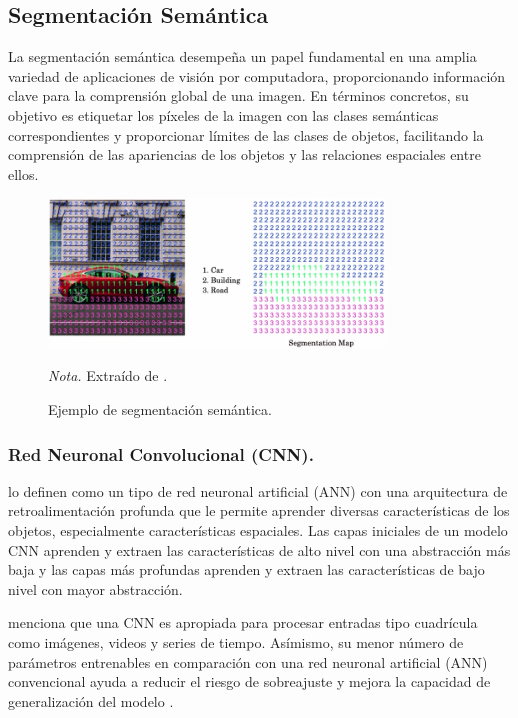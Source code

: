 \subsection{Segmentación Semántica}
La segmentación semántica desempeña un papel fundamental en una amplia variedad de aplicaciones de visión por computadora, proporcionando información clave para la comprensión global de una imagen. 
En términos concretos, su objetivo es etiquetar los píxeles de la imagen con las clases semánticas correspondientes y proporcionar límites de las clases de objetos, facilitando la comprensión de las apariencias de los objetos y las relaciones espaciales entre ellos.
\citep{csurka2023semantic}

\begin{figure}[H]
    \centering
    \caption{Ejemplo de segmentación semántica.}
    \includegraphics[width=0.8\textwidth]{img/4_marco_teorico/segmentation.png}
    \label{fig:semantic_segmentation}
    \begin{flushleft}
        \textit{Nota.} Extraído de \citet{ng_semantic_2023}. 
        \vspace{-\baselineskip}       
    \end{flushleft}  
\end{figure}

\subsubsection{Red Neuronal Convolucional (CNN).}
\citet{balas_recent_2020} lo definen como un tipo de red neuronal artificial (ANN) con una arquitectura de retroalimentación profunda que le permite aprender diversas características de los objetos, 
especialmente características espaciales. Las capas iniciales de un modelo CNN aprenden y extraen las características de alto nivel con una abstracción más baja y las capas más 
profundas aprenden y extraen las características de bajo nivel con mayor abstracción.

\citet{katsaros_backpropagation_2021} menciona que una CNN es apropiada para procesar entradas tipo cuadrícula 
como imágenes, videos y series de tiempo. Asímismo, su menor número de parámetros entrenables en comparación con una red neuronal artificial (ANN) convencional ayuda a reducir el riesgo de 
sobreajuste y mejora la capacidad de generalización del modelo \citep{balas_recent_2020}.

